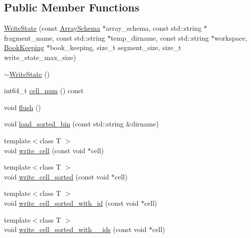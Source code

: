 \subsection*{Public Member Functions}
\begin{DoxyCompactItemize}
\item 
\hyperlink{classWriteState_aa5fe6fb981e1dadbae2c7dc6f816fbbf}{Write\+State} (const \hyperlink{classArraySchema}{Array\+Schema} $\ast$array\+\_\+schema, const std\+::string $\ast$fragment\+\_\+name, const std\+::string $\ast$temp\+\_\+dirname, const std\+::string $\ast$workspace, \hyperlink{classBookKeeping}{Book\+Keeping} $\ast$book\+\_\+keeping, size\+\_\+t segment\+\_\+size, size\+\_\+t write\+\_\+state\+\_\+max\+\_\+size)
\item 
\hyperlink{classWriteState_ab912ccb56ffc74e617d5b41c7835bec0}{$\sim$\+Write\+State} ()
\item 
int64\+\_\+t \hyperlink{classWriteState_a3d324a4b76ba4a1758523811077ad223}{cell\+\_\+num} () const 
\item 
void \hyperlink{classWriteState_a5959dd7d7452e4705b5c1eb341b34712}{flush} ()
\item 
void \hyperlink{classWriteState_af2ac35c439a2ca54b2ccb324c66d48b1}{load\+\_\+sorted\+\_\+bin} (const std\+::string \&dirname)
\item 
{\footnotesize template$<$class T $>$ }\\void \hyperlink{classWriteState_a9cd912901ac8bbb598f46c8c6f3480a6}{write\+\_\+cell} (const void $\ast$cell)
\item 
{\footnotesize template$<$class T $>$ }\\void \hyperlink{classWriteState_affb3bcae32af34bfb843687ac3dcf31b}{write\+\_\+cell\+\_\+sorted} (const void $\ast$cell)
\item 
{\footnotesize template$<$class T $>$ }\\void \hyperlink{classWriteState_a914279607faaa9e281884e6ecb0f38c6}{write\+\_\+cell\+\_\+sorted\+\_\+with\+\_\+id} (const void $\ast$cell)
\item 
{\footnotesize template$<$class T $>$ }\\void \hyperlink{classWriteState_abc7233a5f076c2c1e49497fa663d0853}{write\+\_\+cell\+\_\+sorted\+\_\+with\+\_\+\_\+ids} (const void $\ast$cell)
\end{DoxyCompactItemize}

